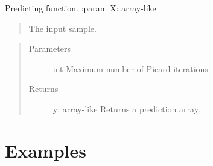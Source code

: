 \documentclass[letterpaper,10pt,english]{sphinxmanual}
\begin{document}
\begin{fulllineitems}
\begin{description}
\end{description}

\begin{fulllineitems}
\label{\detokenize{sections/prediction:IDL.IDLModel.predict}}
Predicting function.
:param X: array-like
\begin{quote}

The input sample.
\end{quote}
\begin{quote}\begin{description}
\item[{Parameters}] \leavevmode
{} \textendash{} int
Maximum number of Picard iterations

\item[{Returns}] \leavevmode
y: array-like
Returns a prediction array.

\end{description}\end{quote}

\end{fulllineitems}


\end{fulllineitems}



\chapter{Examples}
\label{\detokenize{sections/classification_operational_example:examples}}\label{\detokenize{sections/classification_operational_example::doc}}

\section{}
\label{\detokenize{sections/classification_operational_example:classification-mnist}}

\section{}
\label{\detokenize{sections/classification_operational_example:regression-boston-housing}}
\end{document}
